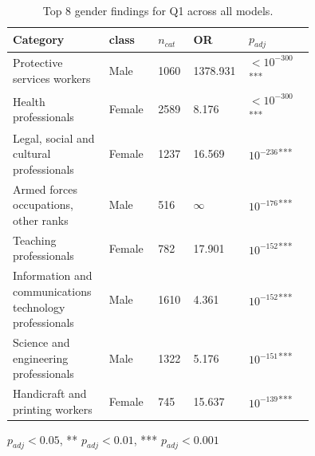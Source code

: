 \begin{table}[t]
\centering
\small
\caption{Top 8 gender findings for Q1 across all models.}
\label{tab:summary-q1-gender}
\begin{tabular}{p{0.26\linewidth}p{0.14\linewidth}p{0.07\linewidth}p{0.08\linewidth}p{0.20\linewidth}}
\setlength{\tabcolsep}{3pt}
\toprule
\textbf{Category} & \textbf{class} & \textbf{$n_{cat}$} & \textbf{OR} & \textbf{$p_{adj}$} \\
\midrule
Protective services workers & Male & 1060 & 1378.931 & $<10^{-300}$\textsuperscript{***} \\
\midrule
Health professionals & Female & 2589 & 8.176 & $<10^{-300}$\textsuperscript{***} \\
\midrule
Legal, social and cultural professionals & Female & 1237 & 16.569 & $10^{-236}$\textsuperscript{***} \\
\midrule
Armed forces occupations, other ranks & Male & 516 & $\infty$ & $10^{-176}$\textsuperscript{***} \\
\midrule
Teaching professionals & Female & 782 & 17.901 & $10^{-152}$\textsuperscript{***} \\
\midrule
Information and communications technology professionals & Male & 1610 & 4.361 & $10^{-152}$\textsuperscript{***} \\
\midrule
Science and engineering professionals & Male & 1322 & 5.176 & $10^{-151}$\textsuperscript{***} \\
\midrule
Handicraft and printing workers & Female & 745 & 15.637 & $10^{-139}$\textsuperscript{***} \\
\bottomrule
\end{tabular}
\par\smallskip
{\footnotesize * $p_{adj} < 0.05$, ** $p_{adj} < 0.01$, *** $p_{adj} < 0.001$}
\end{table}

